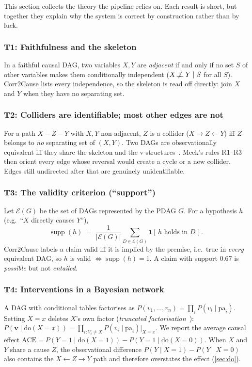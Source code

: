 \documentclass[12pt,a4paper]{article}
\newenvironment{theorybox}[1]{\subsubsection*{#1}}{}
\newcommand{\doop}{\mathrm{do}}
\begin{document}
This section collects the theory the pipeline relies on. Each result is short, but together they explain why the
system is correct by construction rather than by luck.

\begin{theorybox}{T1: Faithfulness and the skeleton}
In a faithful causal DAG, two variables $X,Y$ are \emph{adjacent} if and only if no set $S$ of other variables
makes them conditionally independent ($X \not\!\perp\!\!\!\perp Y \mid S$ for all $S$). Corr2Cause lists every
independence, so the skeleton is read off directly: join $X$ and $Y$ when they have no separating set.
\end{theorybox}

\begin{theorybox}{T2: Colliders are identifiable; most other edges are not}
For a path $X - Z - Y$ with $X,Y$ non-adjacent, $Z$ is a collider ($X\!\rightarrow\!Z\!\leftarrow\!Y$) iff $Z$
belongs to \emph{no} separating set of $(X,Y)$. Two DAGs are observationally equivalent iff they share the skeleton and
the v-structures~\cite{verma1990}. Meek's rules R1--R3~\cite{meek1995} then orient every edge whose reversal would
create a cycle or a new collider. Edges still undirected after that are genuinely unidentifiable.
\end{theorybox}

\begin{theorybox}{T3: The validity criterion (``support'')}
Let $\mathcal{E}(G)$ be the set of DAGs represented by the PDAG $G$. For a hypothesis $h$ (e.g.\ ``$X$ directly causes $Y$''),
\[
  \operatorname{supp}(h) \;=\; \frac{1}{|\mathcal{E}(G)|}\sum_{D\in\mathcal{E}(G)} \mathbf{1}\!\left[\,h \text{ holds in } D\,\right].
\]
Corr2Cause labels a claim valid iff it is implied by the premise, i.e.\ true in \emph{every} equivalent DAG, so
$h$ is valid $\Leftrightarrow \operatorname{supp}(h)=1$. A claim with support $0.67$ is \emph{possible} but not \emph{entailed}.
\end{theorybox}

\begin{theorybox}{T4: Interventions in a Bayesian network}
A DAG with conditional tables factorises as $P(v_1,\dots,v_n)=\prod_i P(v_i\mid \mathrm{pa}_i)$. Setting $X{=}x$
deletes $X$'s own factor (\emph{truncated factorisation}~\cite{pearl2009}):
$P(\mathbf{v}\mid\doop(X{=}x))=\prod_{i:V_i\neq X}P(v_i\mid\mathrm{pa}_i)\big|_{X=x}$.
We report the average causal effect $\mathrm{ACE}=P(Y{=}1\mid\doop(X{=}1))-P(Y{=}1\mid\doop(X{=}0))$.
When $X$ and $Y$ share a cause $Z$, the observational difference $P(Y\mid X{=}1)-P(Y\mid X{=}0)$ also contains
the $X\leftarrow Z\rightarrow Y$ path and therefore overstates the effect (\cref{sec:do}).
\end{theorybox}
\end{document}
